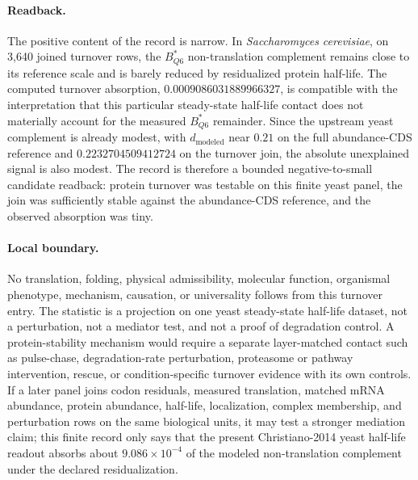 \paragraph{Readback.}
The positive content of the record is narrow.  In \emph{Saccharomyces cerevisiae}, on 3,640 joined turnover rows, the $B^*_{Q6}$ non-translation complement remains close to its reference scale and is barely reduced by residualized protein half-life.  The computed turnover absorption, $0.0009086031889966327$, is compatible with the interpretation that this particular steady-state half-life contact does not materially account for the measured $B^*_{Q6}$ remainder.  Since the upstream yeast complement is already modest, with $d_{\mathrm{modeled}}$ near $0.21$ on the full abundance-CDS reference and $0.2232704509412724$ on the turnover join, the absolute unexplained signal is also modest.  The record is therefore a bounded negative-to-small candidate readback: protein turnover was testable on this finite yeast panel, the join was sufficiently stable against the abundance-CDS reference, and the observed absorption was tiny.

\paragraph{Local boundary.}
No translation, folding, physical admissibility, molecular function, organismal phenotype, mechanism, causation, or universality follows from this turnover entry.  The statistic is a projection on one yeast steady-state half-life dataset, not a perturbation, not a mediator test, and not a proof of degradation control.  A protein-stability mechanism would require a separate layer-matched contact such as pulse-chase, degradation-rate perturbation, proteasome or pathway intervention, rescue, or condition-specific turnover evidence with its own controls.  If a later panel joins codon residuals, measured translation, matched mRNA abundance, protein abundance, half-life, localization, complex membership, and perturbation rows on the same biological units, it may test a stronger mediation claim; this finite record only says that the present Christiano-2014 yeast half-life readout absorbs about $9.086\times 10^{-4}$ of the modeled non-translation complement under the declared residualization.